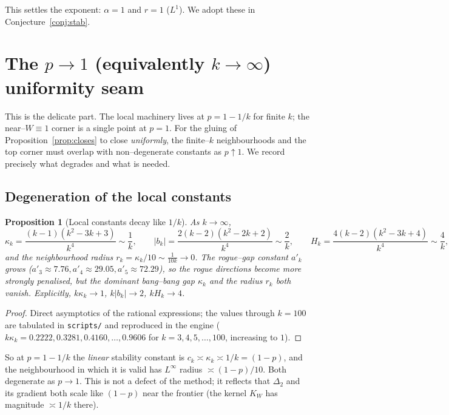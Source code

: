 \documentclass[11pt]{article}
\newtheorem{proposition}[theorem]{Proposition}
\theoremstyle{definition}
\newcommand{\kw}{K_W}
\begin{document}
This settles the exponent: $\alpha=1$ and $r=1$ ($L^1$).  We adopt these in
Conjecture~\ref{conj:stab}.

\section{The $p\to1$ (equivalently $k\to\infty$) uniformity seam}\label{sec:seam}

This is the delicate part.  The local machinery lives at $p=1-1/k$ for finite $k$;
the near--$W\equiv1$ corner is a single point at $p=1$.  For the gluing of
Proposition~\ref{prop:closes} to close \emph{uniformly}, the finite--$k$
neighbourhoods and the top corner must overlap with non--degenerate constants as
$p\uparrow1$.  We record precisely what degrades and what is needed.

\subsection{Degeneration of the local constants}

\begin{proposition}[Local constants decay like $1/k$]\label{prop:decay}
As $k\to\infty$,
\[
  \kappa_k=\frac{(k-1)(k^2-3k+3)}{k^4}\sim\frac1k,\qquad
  |b_k|=\frac{2(k-2)(k^2-2k+2)}{k^4}\sim\frac2k,\qquad
  H_k=\frac{4(k-2)(k^2-3k+4)}{k^4}\sim\frac4k,
\]
and the neighbourhood radius $r_k=\kappa_k/10\sim\tfrac1{10k}\to0$.  The rogue--gap
constant $a'_k$ \emph{grows} ($a'_3\approx7.76,a'_4\approx29.05,a'_5\approx72.29$),
so the rogue directions become \emph{more} strongly penalised, but the dominant
bang--bang gap $\kappa_k$ and the radius $r_k$ both vanish.  Explicitly,
$k\kappa_k\to1$, $k|b_k|\to2$, $kH_k\to4$.
\end{proposition}
\begin{proof}
Direct asymptotics of the rational expressions; the values through $k=100$ are
tabulated in \texttt{scripts/} and reproduced in the engine
($k\kappa_k=0.2222,0.3281,0.4160,\dots,0.9606$ for $k=3,4,5,\dots,100$, increasing
to $1$).
\end{proof}

So at $p=1-1/k$ the \emph{linear} stability constant is $c_k\asymp\kappa_k\asymp
1/k=(1-p)$, and the neighbourhood in which it is valid has $L^\infty$ radius
$\asymp(1-p)/10$.  Both degenerate as $p\to1$.  This is not a defect of the method;
it reflects that $\Delta_2$ and its gradient both scale like $(1-p)$ near the
frontier (the kernel $\kw$ has magnitude $\asymp1/k$ there).
\end{document}
